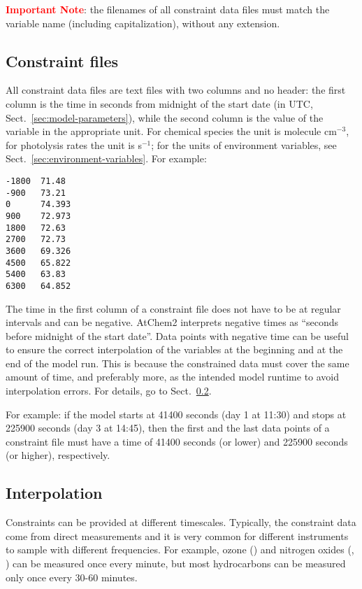 \textcolor{red}{\bf Important Note}: the filenames of all constraint
data files must match the variable name (including capitalization),
without any extension.

\subsection{Constraint files} \label{subsec:constraint-files}

All constraint data files are text files with two columns and no
header: the first column is the time in seconds from midnight of the
start date (in UTC, Sect.~\ref{sec:model-parameters}), while the
second column is the value of the variable in the appropriate unit.
For chemical species the unit is molecule cm$^{-3}$, for photolysis
rates the unit is s$^{-1}$; for the units of environment variables,
see Sect.~\ref{sec:environment-variables}. For example:

\begin{verbatim}
-1800  71.48
-900   73.21
0      74.393
900    72.973
1800   72.63
2700   72.73
3600   69.326
4500   65.822
5400   63.83
6300   64.852
\end{verbatim}

The time in the first column of a constraint file does not have to be
at regular intervals and can be negative. AtChem2 interprets negative
times as ``seconds before midnight of the start date''. Data points
with negative time can be useful to ensure the correct interpolation of
the variables at the beginning and at the end of the model run. This
is because the constrained data must cover the same amount of time, and
preferably more, as the intended model runtime to avoid interpolation
errors. For details, go to Sect.~\ref{subsec:interpolation}.

For example: if the model starts at 41400 seconds (day 1 at 11:30) and
stops at 225900 seconds (day 3 at 14:45), then the first and the last
data points of a constraint file must have a time of 41400 seconds (or
lower) and 225900 seconds (or higher), respectively.

\subsection{Interpolation} \label{subsec:interpolation}

Constraints can be provided at different timescales. Typically, the
constraint data come from direct measurements and it is very common
for different instruments to sample with different frequencies. For
example, ozone () and nitrogen oxides (, ) can
be measured once every minute, but most hydrocarbons can be measured
only once every 30-60 minutes.

